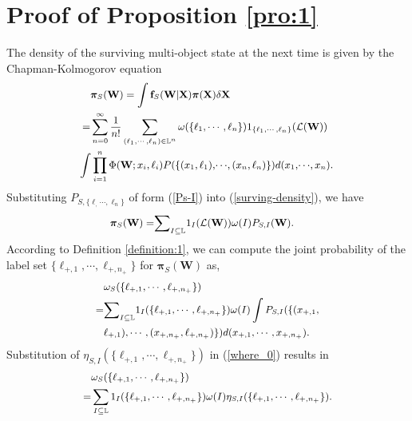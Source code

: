 \documentclass[journal]{IEEEtran}
\newcommand{\bff}{{\mathbf{f}}}
\newcommand{\bW}{{\mathbf W}}
\newcommand{\bX}{{\mathbf X}}
\newcommand{\bpi}{{\boldsymbol\pi}}
\begin{document}
{\section{Proof of Proposition \ref{pro:1}}
The density of the surviving multi-object state at the next time is given by the Chapman-Kolmogorov equation
\begin{equation}\label{surving-density}
{\small
\begin{split}
\!\!&\bpi_S(\bW)=\int \bff_S(\bW|\bX)\bpi(\bX)\delta\bX\\
=&\sum_{n=0}^{\infty}\frac{1}{n!}\sum_{(\ell_1,\cdots,\ell_n)\in\mathbb{L}^n}\omega(\{\ell_1,\cdots,\ell_n\})1_{\{\ell_1,\cdots,\ell_n\}}(\mathcal{L}(\bW))\\&
\!\!\!\!\!\!\! \int \prod_{i=1}^n \Phi(\bW;x_i,\ell_i) P(\{(x_1,\ell_1),\!\cdots\!,(x_n,\ell_n)\})d(x_1,\!\cdots\!,x_n).
\end{split}}
\end{equation}
Substituting   $P_{S,\{\ell_,\cdots,\ell_n\}}$ of form (\ref{Ps-I}) into (\ref{surving-density}), we have
\begin{equation}
{\small
\begin{split}
\label{surving-density-2}
\bpi_S(\bW)
=&
{\sum}_{I\subseteq\mathbb{L}}1_{I}(\mathcal{L}(\bW))\omega(I)P_{S,I}(\bW).
\end{split}}
\end{equation}
According to Definition \ref{definition:1}, we can compute the joint probability of the label set $\{\ell_{+,1},\cdots,\ell_{+,n_+}\}$ for $\bpi_S(\bW)$ as,
\begin{equation}
{\small
\begin{split}
&\omega_S(\{\ell_{+,1},\cdots,\ell_{+,n_+}\})\\
=&{\sum}_{I\subseteq\mathbb{L}}1_{I}(\{\ell_{+,1},\cdots,\ell_{+,n_+}\})\omega(I)\int P_{S,I}(\{(x_{+,1},\\&\ell_{+,1}),\cdots,(x_{+,n_+},\ell_{+,n_+})\})d(x_{+,1},\cdots,x_{+,n_+}).\\
\end{split}
}
\end{equation}
Substitution of $\eta_{S,I}(\{\ell_{+,1},\cdots,\ell_{+,n_+}\})$ in (\ref{where_0}) results in
\begin{equation}
{\small
\begin{split}
&\omega_S(\{\ell_{+,1},\cdots,\ell_{+,n_+}\})\\=&\sum_{I\subseteq\mathbb{L}}1_{I}(\{\ell_{+,1},\cdots,\ell_{+,n_+}\})\omega(I)\eta_{S,I}(\{\ell_{+,1},\cdots,\ell_{+,n_+}\}).
\end{split}}

\end{equation}}
\end{document}
